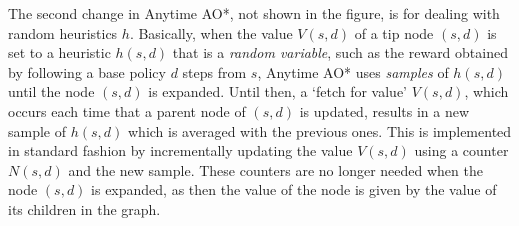 \documentclass[letterpaper]{article}
\newcommand{\Omit}[1]{}
\begin{document}
The second change in Anytime AO*, not shown in the figure, is for
dealing with random heuristics $h$.  Basically, when the value $V(s,d)$ of a tip
node $(s,d)$ is set to a heuristic $h(s,d)$ that is a \emph{random variable},
such as the reward obtained by following a base policy $d$ steps from $s$,
Anytime AO* uses \emph{samples} of $h(s,d)$ until the node $(s,d)$
is expanded. Until then, a `fetch for value'  $V(s,d)$, which occurs each time that a parent node of $(s,d)$ is
updated, results in a new sample of $h(s,d)$ which is averaged with the previous ones.
This is implemented in standard fashion by incrementally
updating the value $V(s,d)$ using a counter $N(s,d)$ and the new sample.
These counters are no longer needed when the node $(s,d)$ is expanded, as then
the value of the node is given by the value of its children in the graph.


\Omit{The result is an algorithm that is a tiny variation of AO*, but which at
the same time fits with the general idea underlying Monte Carlo Tree Search
methods of using approximate sampled values to guide an anytime optimal
search for solutions.}

\Omit{
The optimality of Anytime AO* does not depend on the heuristic values of
tip nodes, which could even change randomly from one iteration to the next.
Like in AO*, however, the better the heuristic values, the better the quality
of Anytime AO*  after a short time window in general. Unlike AO*, however,
better heuristic values do not lead to a smaller explicit graph and
faster termination, as Anytime AO* guarantees optimality only after
the whole implicit graph has been explicated. Since this is also true
of AO* in the worst case, the worst case complexity of both algorithms
is the same.}
\end{document}
